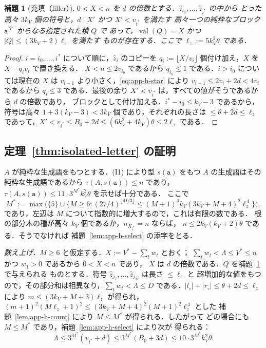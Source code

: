 \documentclass[11pt,a4paper]{ltjsarticle}
\numberwithin{equation}{section}
\theoremstyle{plain}
\newtheorem{lemma}[theorem]{補題}
\theoremstyle{definition}
\theoremstyle{remark}
\theoremstyle{plain}
\begin{document}
\begin{lemma}[充填（filler）]
\label{lem:app-h-filler}
$0<X<n$ を $d$ の倍数とする．$\hat z_{i_0},\ldots,\hat z_{i^*}$ の中から
とった高々 $3k_V$ 個の符号と，$d\mid X'$ かつ $X'<v_{i^*}$ を満たす
高々一つの純粋なブロック $\mathtt a^{X'}$ からなる指定された積 $Q$ で
あって，$\operatorname{val}(Q)=X$ かつ $|Q|\le(3k_V+2)\ell_z$ を満たす
ものが存在する．ここで $\ell_z:=5k_V^2\theta$ である．
\end{lemma}

\begin{proof}
$i=i_0,\ldots,i^*$ について順に，$\hat z_i$ のコピーを
$q_i:=\lfloor X/v_i\rfloor$ 個付け加え，$X$ を $X-q_iv_i$ で置き換える．
$X<n\le2v_{i_0}$ であるから $q_{i_0}\le1$ である．$i>i_0$ については現在の
$X$ は $v_{i-1}$ より小さく，\eqref{eq:app-h-star} により
$v_{i-1}\le2v_i+2d<4v_i$ であるから $q_i\le3$ である．最後の余り
$X'<v_{i^*}$ は，すべての値がそうであるから $d$ の倍数であり，
ブロックとして付け加える．$i^*-i_0\le k_V-3$ であるから，符号は高々
$1+3(k_V-3)<3k_V$ 個であり，それぞれの長さは $\le\theta+2d\le\ell_z$
であって，$X'<v_{i^*}\le B_0+2d\le(6k_V^2+4k_V)\theta\le2\ell_z$ である．
\end{proof}

\subsection{定理~\ref{thm:isolated-letter} の証明}

$A$ が純粋な生成語をもつとする．(I1) により型 $s(\mathtt a)$ をもつ $A$
の生成語はその純粋な生成語であるから $\tau(A,s(\mathtt a))\le n$ であり，
$\tau(A,s(\mathtt a))\le11\cdot3^{M^*}k_V^2\theta$ を示せば十分である．
ここで
\[
 M^*:=\max\bigl(\{5\}\cup\{M\ge6:(27/4)^{\lfloor M/3\rfloor}
 \le(M+1)^4k_V(3k_V+M+4)^2\ell_z^{\,4}\}\bigr),
\]
であり，左辺は $M$ について指数的に増大するので，これは有限の数である．
根の部分木の種が高々 $k_V$ 個であるか，$n_{X_{i^*}}=n$ ならば，
$n\le2k_V(k_V+2)\theta$ である．そうでなければ
補題~\ref{lem:app-h-select} の添字をとる．

\emph{数え上げ．}$M\ge6$ と仮定する．$X:=V^*-\sum_tw_t$ とおく；
$\sum_tw_t<\Lambda\le V^*\le n$ かつ $w_1>0$ であるから $0<X<n$ であり，
$X$ は $d$ の倍数である．$Q$ を補題~\ref{lem:app-h-filler} で与えられる
ものとする．符号 $\hat z_{j_1},\ldots,\hat z_{j_M}$ は長さ $\le\ell_z$ と
超増加的な値をもつので，その部分和は相異なり，$\sum_tw_t<\Lambda\le D$
である．$|l_\circ|+|r_\circ|\le\theta+2d\le\ell_z$ により
$m\le(3k_V+M+3)\ell_z$ が得られ，
$(m+1)^2(M\ell_z+1)^2\le(3k_V+M+4)^2(M+1)^2\ell_z^{\,4}$ とした
補題~\ref{lem:app-h-count} により $M\le M^*$ が得られる．したがって
どの場合にも $M\le M^*$ であり，補題~\ref{lem:app-h-select} により次が
得られる：
\[
 \Lambda\le3^{M^*}(v_{i^*}+d)\le3^{M^*}(B_0+3d)\le10\cdot3^{M^*}k_V^2\theta .
\]
\end{document}
